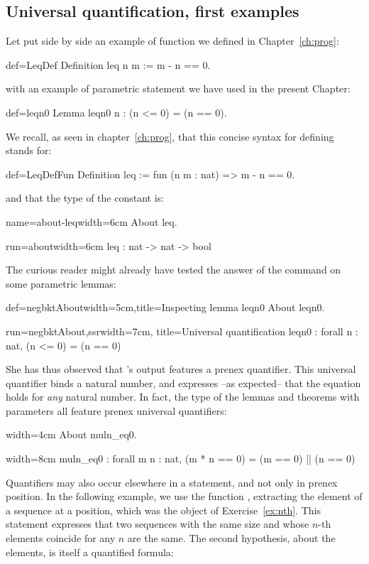 \subsection{Universal quantification, first examples}

Let put side by side an example of function we defined in
Chapter~\ref{ch:prog}:

\begin{coq}{def=LeqDef}{}
Definition leq n m := m - n == 0.
\end{coq}
with an example of parametric statement we have used in the present
Chapter:

\begin{coq}{def=leqn0}{}
Lemma leqn0 n : (n <= 0) = (n == 0).
\end{coq}

We recall, as seen in chapter~\ref{ch:prog}, that this concise syntax
for defining  stands for:

\begin{coq}{def=LeqDefFun}{}
Definition leq := fun (n m : nat) => m - n == 0.
\end{coq}
and that the type of the constant  is:

\begin{coq}{name=about-leq}{width=6cm}
About leq.
\end{coq}
\begin{coqout}{run=about}{width=6cm}
leq : nat -> nat -> bool
\end{coqout}

The curious reader might already have tested the answer of the
 command on some parametric lemmas:

\begin{coq}{def=negbktAbout}{width=5cm,title=Inspecting lemma leqn0}
About leqn0.
\end{coq}
\begin{coqout}{run=negbktAbout,ssr}{width=7cm, title=Universal quantification}
leqn0 : forall n : nat, (n <= 0) = (n == 0)
\end{coqout}

She has thus observed that \Coq{}'s output features a prenex
 quantifier. This universal quantifier binds a natural number, and
expresses --as expected-- that the equation holds for \emph{any}
natural number. In fact, the type of the lemmas and theorems with
parameters all feature prenex universal quantifiers:

\begin{coq}{}{width=4cm}
About muln_eq0.
$~$
\end{coq}
\begin{coqout}{}{width=8cm}
muln_eq0 : forall m n : nat,
  (m * n == 0) = (m == 0) || (n == 0)
\end{coqout}
Quantifiers may also occur elsewhere in a statement, and not only in
prenex position.  In the following example, we use the function
, extracting the element of a sequence at a position, which was
the object of Exercise~\ref{ex:nth}. This statement expresses that two
sequences with the same size and whose $n$-th elements coincide for any
$n$ are the same. The second hypothesis, about the elements, is
itself a quantified formula:

